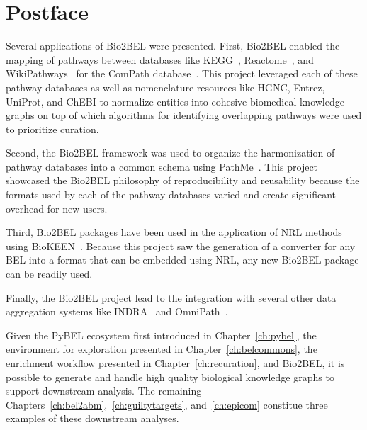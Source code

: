 \section*{Postface}

Several applications of Bio2BEL were presented.
First, Bio2BEL enabled the mapping of pathways between databases like \ac{KEGG}~\cite{Kanehisa2017}, Reactome~\cite{Fabregat2016}, and WikiPathways~\cite{Slenter2018} for the ComPath database~\cite{Domingo-Fernandez2018}.
This project leveraged each of these pathway databases as well as nomenclature resources like HGNC, Entrez, UniProt, and ChEBI to normalize entities into cohesive biomedical knowledge graphs on top of which algorithms for identifying overlapping pathways were used to prioritize curation.

Second, the Bio2BEL framework was used to organize the harmonization of pathway databases into a common schema using PathMe~\cite{Domingo-Fernandez2019a}.
This project showcased the Bio2BEL philosophy of reproducibility and reusability because the formats used by each of the pathway databases varied and create significant overhead for new users.

Third, Bio2BEL packages have been used in the application of \ac{NRL} methods using BioKEEN~\cite{Ali2019}.
Because this project saw the generation of a converter for any \ac{BEL} into a format that can be embedded using \ac{NRL}, any new Bio2BEL package can be readily used.

Finally, the Bio2BEL project lead to the integration with several other data aggregation systems like \ac{INDRA}~\cite{Gyori2017} and OmniPath~\cite{Turei2016}.

Given the PyBEL ecosystem first introduced in Chapter~\ref{ch:pybel}, the environment for exploration presented in Chapter~\ref{ch:belcommons}, the enrichment workflow presented in Chapter~\ref{ch:recuration}, and Bio2BEL, it is possible to generate and handle high quality biological knowledge graphs to support downstream analysis.
The remaining Chapters~\ref{ch:bel2abm},~\ref{ch:guiltytargets}, and~\ref{ch:epicom} constitue three examples of these downstream analyses.
